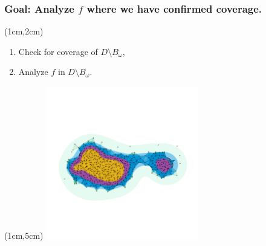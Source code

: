 \begin{frame}
  \frametitle{{\small {\color{red} \textbf{Goal:}} Analyze $f$ where we have confirmed coverage.}}

  \begin{textblock*}{12cm}(1cm,2cm)
    \begin{enumerate}
      \item<2,3> Check for coverage of $D\setminus B_\omega$,
      \item<3> Analyze $f$ in $D\setminus B_\omega$.
    \end{enumerate}
  \end{textblock*}

  \begin{textblock*}{12cm}(1cm,5cm)
    \includegraphics[trim=200 600 200 800, clip, width=0.5\textwidth]{figures/samples/scalar1}
  \end{textblock*}
\end{frame}

